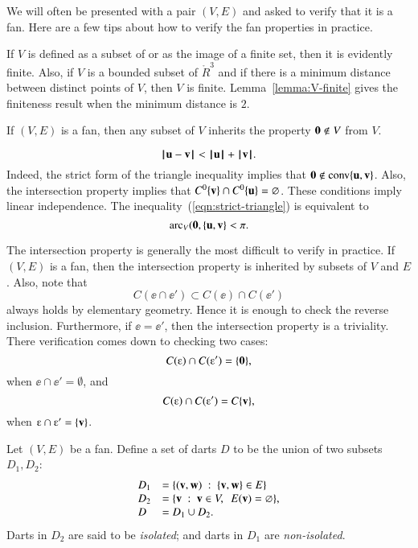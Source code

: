 \begin{remark}\label{remark:fan-verify}  
We will often be presented with a pair $(V,E)$ and asked to verify that it is a fan.  Here are a few tips about how to verify the fan properties in practice.
\begin{nomerate} 
\item {}  If $V$ is defined as a subset of or as the image of a finite set, then it is evidently finite.   Also, if $V$ is a bounded subset of $\ring{R}^3$ and if there is a minimum distance between distinct points of $V$, then $V$ is finite.  Lemma~\ref{lemma:V-finite} gives the finiteness result when the minimum distance is $2$.
\item {}  If $(V,E)$ is a fan, then any subset of $V$ inherits the property ${\mathbf 0}\not\in V$ from $V$.  
\item {} 
\begin{equation}\label{eqn:strict-triangle}
{\hskip0.1em|\hskip-0.15em|\hskip0.1em}{\mathbf u} - {\mathbf v}{\hskip0.1em|\hskip-0.15em|\hskip0.1em} < {{\hskip0.1em|\hskip-0.15em|\hskip0.1em}{\mathbf u}{\hskip0.1em|\hskip-0.15em|\hskip0.1em}} + {{\hskip0.1em|\hskip-0.15em|\hskip0.1em}{\mathbf v}{\hskip0.1em|\hskip-0.15em|\hskip0.1em}}.
\end{equation}
Indeed, the strict form of the triangle inequality implies that ${\mathbf 0}\not\in {\operatorname{conv}}\{{\mathbf u},{\mathbf v}\}$.  Also,
 the intersection property implies 
 that $C^0\{{\mathbf v}\} \cap C^0\{{\mathbf u}\} = \varnothing$.  These conditions imply linear independence.
The inequality~(\ref{eqn:strict-triangle}) is equivalent to
$$
\operatorname{arc}_V({\mathbf 0},\{{\mathbf u},{\mathbf v}\} < \pi.
$$
\item {} The intersection property is generally the most difficult to verify in practice.  If $(V,E)$ is a fan, then the intersection property is inherited by subsets of $V$ and $E$.  Also, note  that
$$
C(\ee\cap \ee') \subset C(\ee) \cap C(\ee')
$$
always holds by elementary geometry.  Hence it is enough to check the reverse inclusion.  Furthermore, if $\ee = \ee'$, then the intersection property is a triviality.  There verification comes down to checking two cases:
$$
C(\ee) \cap C(\ee') = \{\orz\},
$$
when $\ee\cap \ee' = \emptyset$, and
$$
C(\ee)\cap C(\ee') = C\{\v\},
$$
when $\ee\cap \ee' = \{\v\}$.
\end{nomerate}
\end{remark}


Let $(V,E)$ be a fan.  Define a set of darts $D$ to be the union of
two subsets $D_1,D_2$:
    $$
    \begin{array}{lll}
    D_1 &= \{({\mathbf v},{\mathbf w})\ :\  \{{\mathbf v},{\mathbf w}\}\in E\}\\
    D_2 &= \{{\mathbf v} \ :\  {\mathbf v}\in V,\ \ E({\mathbf v}) = \varnothing\},\\
    D   &= D_1\cup D_2.
    \end{array}
    $$
Darts in $D_2$ are said to be {\it isolated}; and darts in $D_1$ are {\it non-isolated}.
%
%
%
%
%
%
%

